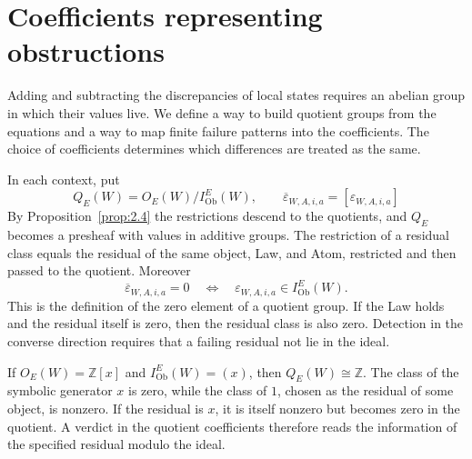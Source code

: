 \section{Coefficients representing obstructions}\label{sec:2.3}

Adding and subtracting the discrepancies of local states requires an abelian group in
which their values live. We define a way to build quotient groups from the equations and a
way to map finite failure patterns into the coefficients. The choice of coefficients
determines which differences are treated as the same.

\begin{construction}\label{cons:2.12}

In each context, put
\begin{equation*}
Q_E(W)=O_E(W)/I_{\mathrm{Ob}}^E(W),
\qquad
\overline\varepsilon_{W,A,i,a}=[\varepsilon_{W,A,i,a}]
\tag{2.8}\label{eq:2.8}
\end{equation*}
By Proposition~\ref{prop:2.4} the restrictions descend to the quotients, and $Q_E$ becomes
a presheaf with values in additive groups. The restriction of a residual class equals the
residual of the same object, Law, and Atom, restricted and then passed to the quotient.
Moreover
\[
\overline\varepsilon_{W,A,i,a}=0
\quad\Longleftrightarrow\quad
\varepsilon_{W,A,i,a}\in I_{\mathrm{Ob}}^E(W).
\]
This is the definition of the zero element of a quotient group. If the Law holds and the
residual itself is zero, then the residual class is also zero. Detection in the converse
direction requires that a failing residual not lie in the ideal.

\end{construction}

\begin{example}\label{ex:2.13}

If $O_E(W)=\mathbb{Z}[x]$ and $I_{\mathrm{Ob}}^E(W)=(x)$, then $Q_E(W)\cong\mathbb{Z}$.
The class of the symbolic generator $x$ is zero, while the class of $1$, chosen as the
residual of some object, is nonzero. If the residual is $x$, it is itself nonzero but
becomes zero in the quotient. A verdict in the quotient coefficients therefore reads the
information of the specified residual modulo the ideal.

\end{example}

